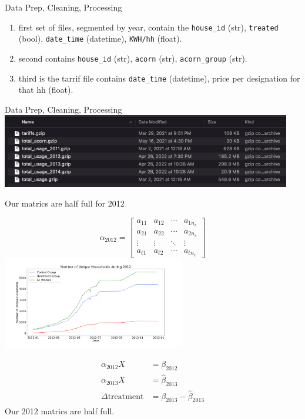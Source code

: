\documentclass{beamer}
\begin{document}
\begin{frame}{Data Prep, Cleaning, Processing}
  \begin{enumerate}
    \item<+-> first set of files, segmented by year, contain the \texttt{house\_id} (str), \texttt{treated} (bool), \texttt{date\_time} (datetime), \texttt{KWH/hh} (float).
    \item<+-> second contains \texttt{house\_id} (str), \texttt{acorn} (str), \texttt{acorn\_group} (str).
    \item<+-> third is the tarrif file contains \texttt{date\_time} (datetime), price per designation for that hh (float).
  \end{enumerate}
\end{frame}

\begin{frame}{Data Prep, Cleaning, Processing}
  \includegraphics[width=0.95\textwidth]{images/lcl-clean-files.png}
\end{frame}

\begin{frame}{Our matrics are half full for 2012}
  \begin{multicols}{2}
    $$
    \alpha_{2012} = \left[\begin{array}{cccc}
    a_{11} & a_{12} & \cdots & a_{1 n_c} \\
    a_{21} & a_{22} & \cdots & a_{2 n_c} \\
    \vdots & \vdots & \ddots & \vdots \\
    a_{t 1} & a_{t 2} & \cdots & a_{t n_c}
    \end{array}\right]
    $$
    \break
    \centering
    \includegraphics[width=0.6\textwidth]{images/unique-houses-2012.png}
  \end{multicols}
  \vspace{-1cm}
  \begin{align*}
    \begin{split}
        \alpha_{2012} X &= \beta_{2012} \\
        \alpha_{2013} X &= \hat\beta_{2013} \\
        \Delta\mbox{treatment} &= \beta_{2013} - \hat\beta_{2013}
    \end{split}
  \end{align*}
  Our 2012 matrics are half full.
\end{frame}
\end{document}
